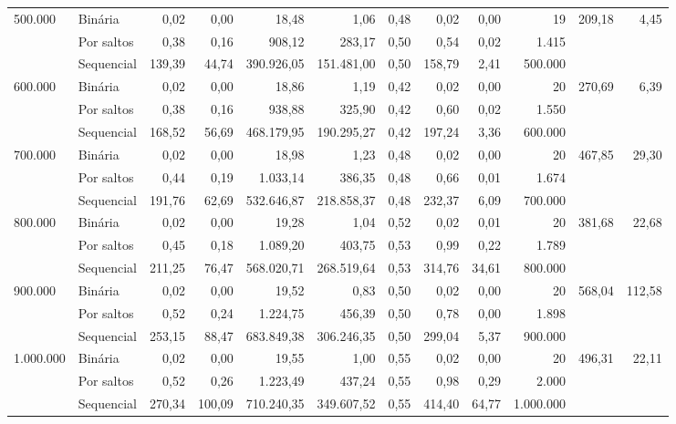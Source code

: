 \begin{table}
\begin{tabular}{llrrrrrrrrrr}
\cline{1-12}
\multirow[c]{3}{*}{500.000} & Binária & 0,02 & 0,00 & 18,48 & 1,06 & 0,48 & 0,02 & 0,00 & 19 & \multirow[r]{3}{*}{209,18} & \multirow[r]{3}{*}{4,45} \\
 & Por saltos & 0,38 & 0,16 & 908,12 & 283,17 & 0,50 & 0,54 & 0,02 & 1.415 \\
 & Sequencial & 139,39 & 44,74 & 390.926,05 & 151.481,00 & 0,50 & 158,79 & 2,41 & 500.000 \\
\cline{1-12}
\multirow[c]{3}{*}{600.000} & Binária & 0,02 & 0,00 & 18,86 & 1,19 & 0,42 & 0,02 & 0,00 & 20 & \multirow[r]{3}{*}{270,69} & \multirow[r]{3}{*}{6,39} \\
 & Por saltos & 0,38 & 0,16 & 938,88 & 325,90 & 0,42 & 0,60 & 0,02 & 1.550 \\
 & Sequencial & 168,52 & 56,69 & 468.179,95 & 190.295,27 & 0,42 & 197,24 & 3,36 & 600.000 \\
\cline{1-12}
\multirow[c]{3}{*}{700.000} & Binária & 0,02 & 0,00 & 18,98 & 1,23 & 0,48 & 0,02 & 0,00 & 20 & \multirow[r]{3}{*}{467,85} & \multirow[r]{3}{*}{29,30} \\
 & Por saltos & 0,44 & 0,19 & 1.033,14 & 386,35 & 0,48 & 0,66 & 0,01 & 1.674 \\
 & Sequencial & 191,76 & 62,69 & 532.646,87 & 218.858,37 & 0,48 & 232,37 & 6,09 & 700.000 \\
\cline{1-12}
\multirow[c]{3}{*}{800.000} & Binária & 0,02 & 0,00 & 19,28 & 1,04 & 0,52 & 0,02 & 0,01 & 20 & \multirow[r]{3}{*}{381,68} & \multirow[r]{3}{*}{22,68} \\
 & Por saltos & 0,45 & 0,18 & 1.089,20 & 403,75 & 0,53 & 0,99 & 0,22 & 1.789 \\
 & Sequencial & 211,25 & 76,47 & 568.020,71 & 268.519,64 & 0,53 & 314,76 & 34,61 & 800.000 \\
\cline{1-12}
\multirow[c]{3}{*}{900.000} & Binária & 0,02 & 0,00 & 19,52 & 0,83 & 0,50 & 0,02 & 0,00 & 20 & \multirow[r]{3}{*}{568,04} & \multirow[r]{3}{*}{112,58} \\
 & Por saltos & 0,52 & 0,24 & 1.224,75 & 456,39 & 0,50 & 0,78 & 0,00 & 1.898 \\
 & Sequencial & 253,15 & 88,47 & 683.849,38 & 306.246,35 & 0,50 & 299,04 & 5,37 & 900.000 \\
\cline{1-12}
\multirow[c]{3}{*}{1.000.000} & Binária & 0,02 & 0,00 & 19,55 & 1,00 & 0,55 & 0,02 & 0,00 & 20 & \multirow[r]{3}{*}{496,31} & \multirow[r]{3}{*}{22,11} \\
 & Por saltos & 0,52 & 0,26 & 1.223,49 & 437,24 & 0,55 & 0,98 & 0,29 & 2.000 \\
 & Sequencial & 270,34 & 100,09 & 710.240,35 & 349.607,52 & 0,55 & 414,40 & 64,77 & 1.000.000 \\
\bottomrule
\end{tabular}
\end{table}
